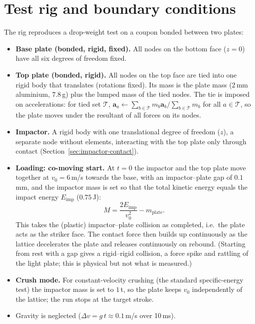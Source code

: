 \documentclass[11pt,a4paper]{article}
\newcommand{\vect}[1]{\bm{#1}}
\begin{document}
\section{Test rig and boundary conditions}
\label{sec:rig}
The rig reproduces a drop-weight test on a coupon bonded between two plates:
\begin{itemize}
\item \textbf{Base plate (bonded, rigid, fixed).} All nodes on the bottom face ($z=0$) have all six degrees of
freedom fixed.
\item \textbf{Top plate (bonded, rigid).} All nodes on the top face are tied into one rigid body that
translates (rotations fixed). Its mass is the plate mass ($2$\,mm aluminium, $7.8$\,g) plus the lumped mass of
the tied nodes. The tie is imposed on accelerations: for tied set $\mathcal{T}$,
$\vect{a}_a \leftarrow \sum_{b\in\mathcal T} m_b\vect{a}_b / \sum_{b\in\mathcal T} m_b$ for all $a\in\mathcal T$,
so the plate moves under the resultant of all forces on its nodes.
\item \textbf{Impactor.} A rigid body with one translational degree of freedom ($z$), a separate node without
elements, interacting with the top plate only through contact (Section~\ref{sec:impactor-contact}).
\item \textbf{Loading: co-moving start.} At $t=0$ the impactor and the top plate move together at
$v_0 = 6$\,m/s towards the base, with an impactor--plate gap of $0.1$\,mm, and the impactor mass is set so
that the total kinetic energy equals the impact energy $E_\mathrm{imp}$ ($0.75$\,J):
\begin{equation}
M = \frac{2E_\mathrm{imp}}{v_0^2} - m_\mathrm{plate} .
\end{equation}
This takes the (plastic) impactor--plate collision as completed, i.e.\ the plate acts as the striker face.
The contact force then builds up continuously as the lattice decelerates the plate and releases continuously on
rebound. (Starting from rest with a gap gives a rigid--rigid collision, a force spike and rattling of the light
plate; this is physical but not what is measured.)
\item \textbf{Crush mode.} For constant-velocity crushing (the standard specific-energy test) the impactor mass
is set to $1$\,t, so the plate keeps $v_0$ independently of the lattice; the run stops at the target stroke.
\item Gravity is neglected ($\Delta v = g\,t \approx 0.1$\,m/s over 10\,ms).
\end{itemize}
\end{document}
